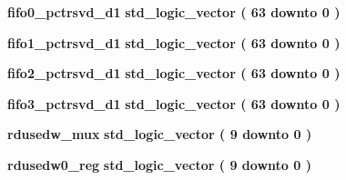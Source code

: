 \begin{DoxyCompactItemize}
\item 
{\bf fifo0\+\_\+pctrsvd\+\_\+d1} {\bfseries \textcolor{comment}{std\+\_\+logic\+\_\+vector}\textcolor{vhdlchar}{ }\textcolor{vhdlchar}{(}\textcolor{vhdlchar}{ }\textcolor{vhdlchar}{ } \textcolor{vhdldigit}{63} \textcolor{vhdlchar}{ }\textcolor{keywordflow}{downto}\textcolor{vhdlchar}{ }\textcolor{vhdlchar}{ } \textcolor{vhdldigit}{0} \textcolor{vhdlchar}{ }\textcolor{vhdlchar}{)}\textcolor{vhdlchar}{ }} 
\item 
{\bf fifo1\+\_\+pctrsvd\+\_\+d1} {\bfseries \textcolor{comment}{std\+\_\+logic\+\_\+vector}\textcolor{vhdlchar}{ }\textcolor{vhdlchar}{(}\textcolor{vhdlchar}{ }\textcolor{vhdlchar}{ } \textcolor{vhdldigit}{63} \textcolor{vhdlchar}{ }\textcolor{keywordflow}{downto}\textcolor{vhdlchar}{ }\textcolor{vhdlchar}{ } \textcolor{vhdldigit}{0} \textcolor{vhdlchar}{ }\textcolor{vhdlchar}{)}\textcolor{vhdlchar}{ }} 
\item 
{\bf fifo2\+\_\+pctrsvd\+\_\+d1} {\bfseries \textcolor{comment}{std\+\_\+logic\+\_\+vector}\textcolor{vhdlchar}{ }\textcolor{vhdlchar}{(}\textcolor{vhdlchar}{ }\textcolor{vhdlchar}{ } \textcolor{vhdldigit}{63} \textcolor{vhdlchar}{ }\textcolor{keywordflow}{downto}\textcolor{vhdlchar}{ }\textcolor{vhdlchar}{ } \textcolor{vhdldigit}{0} \textcolor{vhdlchar}{ }\textcolor{vhdlchar}{)}\textcolor{vhdlchar}{ }} 
\item 
{\bf fifo3\+\_\+pctrsvd\+\_\+d1} {\bfseries \textcolor{comment}{std\+\_\+logic\+\_\+vector}\textcolor{vhdlchar}{ }\textcolor{vhdlchar}{(}\textcolor{vhdlchar}{ }\textcolor{vhdlchar}{ } \textcolor{vhdldigit}{63} \textcolor{vhdlchar}{ }\textcolor{keywordflow}{downto}\textcolor{vhdlchar}{ }\textcolor{vhdlchar}{ } \textcolor{vhdldigit}{0} \textcolor{vhdlchar}{ }\textcolor{vhdlchar}{)}\textcolor{vhdlchar}{ }} 
\item 
{\bf rdusedw\+\_\+mux} {\bfseries \textcolor{comment}{std\+\_\+logic\+\_\+vector}\textcolor{vhdlchar}{ }\textcolor{vhdlchar}{(}\textcolor{vhdlchar}{ }\textcolor{vhdlchar}{ } \textcolor{vhdldigit}{9} \textcolor{vhdlchar}{ }\textcolor{keywordflow}{downto}\textcolor{vhdlchar}{ }\textcolor{vhdlchar}{ } \textcolor{vhdldigit}{0} \textcolor{vhdlchar}{ }\textcolor{vhdlchar}{)}\textcolor{vhdlchar}{ }} 
\item 
{\bf rdusedw0\+\_\+reg} {\bfseries \textcolor{comment}{std\+\_\+logic\+\_\+vector}\textcolor{vhdlchar}{ }\textcolor{vhdlchar}{(}\textcolor{vhdlchar}{ }\textcolor{vhdlchar}{ } \textcolor{vhdldigit}{9} \textcolor{vhdlchar}{ }\textcolor{keywordflow}{downto}\textcolor{vhdlchar}{ }\textcolor{vhdlchar}{ } \textcolor{vhdldigit}{0} \textcolor{vhdlchar}{ }\textcolor{vhdlchar}{)}\textcolor{vhdlchar}{ }} 

\end{DoxyCompactItemize}
